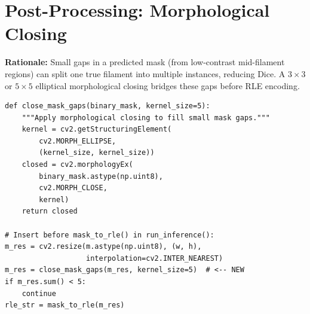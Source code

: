 \documentclass[11pt,a4paper,openany]{report}
\begin{document}
\section{Post-Processing: Morphological Closing}

\textbf{Rationale:} Small gaps in a predicted mask (from low-contrast mid-filament regions) can
split one true filament into multiple instances, reducing Dice. A $3\times3$ or $5\times5$
elliptical morphological closing bridges these gaps before RLE encoding.

\begin{lstlisting}[caption={Morphological closing to fill intra-filament gaps},label={lst:morph}]
def close_mask_gaps(binary_mask, kernel_size=5):
    """Apply morphological closing to fill small mask gaps."""
    kernel = cv2.getStructuringElement(
        cv2.MORPH_ELLIPSE,
        (kernel_size, kernel_size))
    closed = cv2.morphologyEx(
        binary_mask.astype(np.uint8),
        cv2.MORPH_CLOSE,
        kernel)
    return closed

# Insert before mask_to_rle() in run_inference():
m_res = cv2.resize(m.astype(np.uint8), (w, h),
                   interpolation=cv2.INTER_NEAREST)
m_res = close_mask_gaps(m_res, kernel_size=5)  # <-- NEW
if m_res.sum() < 5:
    continue
rle_str = mask_to_rle(m_res)
\end{lstlisting}
\end{document}
